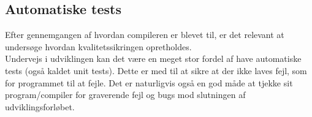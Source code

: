 \subsection{Automatiske tests}
Efter gennemgangen af hvordan compileren er blevet til, er det relevant at undersøge hvordan kvalitetssikringen opretholdes. \\

\noindent Undervejs i udviklingen kan det være en meget stor fordel af have automatiske tests (også kaldet unit tests). Dette er med til at sikre at der ikke laves fejl, som for programmet til at fejle. Det er naturligvis også en god måde at tjekke sit program/compiler for graverende fejl og bugs mod slutningen af udviklingsforløbet.